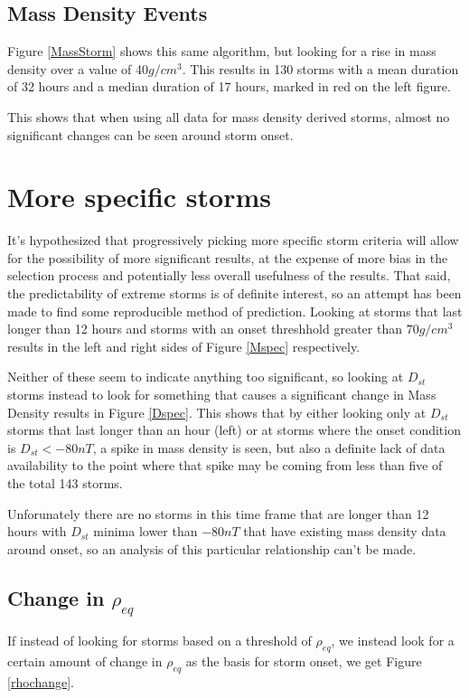 \documentclass[10pt,twocolumn]{article}
\begin{document}
\subsection{Mass Density Events}
Figure \ref{MassStorm} shows this same algorithm, but looking for a rise in mass density over a value of 40$g/cm^3$. This results in 130 storms with a mean duration of 32 hours and a median duration of 17 hours, marked in red on the left figure.

This shows that when using all data for mass density derived storms, almost no significant changes can be seen around storm onset.

\section{More specific storms}
It's hypothesized that progressively picking more specific storm criteria will allow for the possibility of more significant results, at the expense of more bias in the selection process and potentially less overall usefulness of the results. That said, the predictability of extreme storms is of definite interest, so an attempt has been made to find some reproducible method of prediction. Looking at storms that last longer than 12 hours and storms with an onset threshhold greater than $70g/cm^3$ results in the left and right sides of Figure \ref{Mspec} respectively.



Neither of these seem to indicate anything too significant, so looking at $D_{st}$ storms instead to look for something that causes a significant change in Mass Density results in Figure \ref{Dspec}. This shows that by either looking only at $D_{st}$ storms that last longer than an hour (left) or at storms where the onset condition is $D_{st}<-80nT$, a spike in mass density is seen, but also a definite lack of data availability to the point where that spike may be coming from less than five of the total 143 storms. 



Unforunately there are no storms in this time frame that are longer than 12 hours with $D_{st}$ minima lower than $-80nT$ that have existing mass density data around onset, so an analysis of this particular relationship can't be made.

\subsection{Change in $\rho_{eq}$}
If instead of looking for storms based on a threshold of $\rho_{eq}$, we instead look for a certain amount of change in $\rho_{eq}$ as the basis for storm onset, we get Figure \ref{rhochange}.
\end{document}
